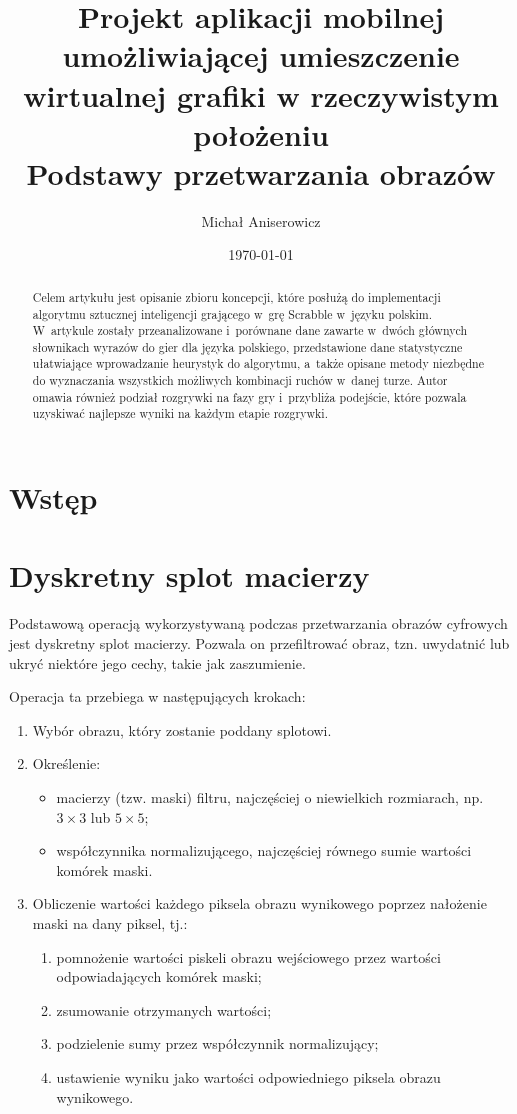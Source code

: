 \documentclass[a4paper,twocolumn,12pt]{article}
\title{
 \LARGE{Projekt aplikacji mobilnej umożliwiającej umieszczenie wirtualnej grafiki w rzeczywistym położeniu} 
 \\ \vspace{2mm} 
 \large{Podstawy przetwarzania obrazów}
}
\author{Michał Aniserowicz}
\date{\today}
\begin{document}
\maketitle

\begin{abstract}
Celem artykułu jest opisanie zbioru koncepcji, które posłużą do implementacji algorytmu sztucznej inteligencji grającego w~grę Scrabble w~języku polskim. W~artykule zostały przeanalizowane i~porównane dane zawarte w~dwóch głównych słownikach wyrazów do gier dla języka polskiego, przedstawione dane statystyczne ułatwiające wprowadzanie heurystyk do algorytmu, a~także opisane metody niezbędne do wyznaczania wszystkich możliwych kombinacji ruchów w~danej turze. Autor omawia również podział rozgrywki na fazy gry i~przybliża podejście, które pozwala uzyskiwać najlepsze wyniki na każdym etapie rozgrywki.
\end{abstract}

\section*{Wstęp}



\section{Dyskretny splot macierzy}

Podstawową operacją wykorzystywaną podczas przetwarzania obrazów cyfrowych jest dyskretny splot macierzy.
Pozwala on przefiltrować obraz, tzn. uwydatnić lub ukryć niektóre jego cechy, takie jak zaszumienie.

Operacja ta przebiega w następujących krokach:

\begin{enumerate}
 \item Wybór obrazu, który zostanie poddany splotowi.
 \item Określenie:
  \begin{itemize}
   \item macierzy (tzw. maski) filtru, najczęściej o niewielkich rozmiarach, np. $3 \times 3$ lub $5 \times 5$;
   \item współczynnika normalizującego, najczęściej równego sumie wartości komórek maski.
  \end{itemize}
 \item Obliczenie wartości każdego piksela obrazu wynikowego poprzez nałożenie maski na dany piksel, tj.:
  \begin{enumerate}
   \item pomnożenie wartości piskeli obrazu wejściowego przez wartości odpowiadających komórek maski;
   \item zsumowanie otrzymanych wartości;
   \item podzielenie sumy przez współczynnik normalizujący;
   \item ustawienie wyniku jako wartości odpowiedniego piksela obrazu wynikowego.
  \end{enumerate}
\end{enumerate}
\end{document}
